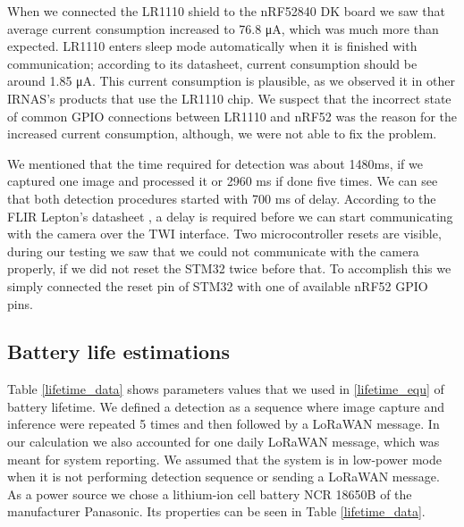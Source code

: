 When we connected the LR1110 shield to the nRF52840 DK board we saw that average current consumption increased to 76.8 \si{\micro\ampere}, which was much more than expected.
LR1110 enters sleep mode automatically when it is finished with communication; according to its datasheet\cite{lr1110_datasheet}, current consumption should be around 1.85 \si{\micro\ampere}.
This current consumption is plausible, as we observed it in other IRNAS's products that use the LR1110 chip.
We suspect that the incorrect state of common GPIO connections between LR1110 and nRF52 was the reason for the increased current consumption, although, we were not able to fix the problem.

We mentioned that the time required for detection was about 1480\si{\milli\second}, if we captured one image and processed it or 2960 \si{\milli\second} if done five times.
We can see that both detection procedures started with 700 \si{\milli\second} of delay.
According to the FLIR Lepton's datasheet \cite{flir_datasheet}, a delay is required before we can start communicating with the camera over the TWI interface.
Two microcontroller resets are visible, during our testing we saw that we could not communicate with the camera properly, if we did not reset the STM32 twice before that.
To accomplish this we simply connected the reset pin of STM32 with one of available nRF52 GPIO pins.


\subsection{ Battery life estimations}

Table \ref{lifetime_data} shows parameters values that we used in \ref{lifetime_equ} of battery lifetime.
We defined a detection as a sequence where image capture and inference were repeated 5 times and then followed by a LoRaWAN message.
In our calculation we also accounted for one daily LoRaWAN message, which was meant for system reporting.
We assumed that the system is in low-power mode when it is not performing detection sequence or sending a LoRaWAN message.
As a power source we chose a lithium-ion cell battery NCR 18650B of the manufacturer Panasonic.
Its properties can be seen in Table \ref{lifetime_data}.


